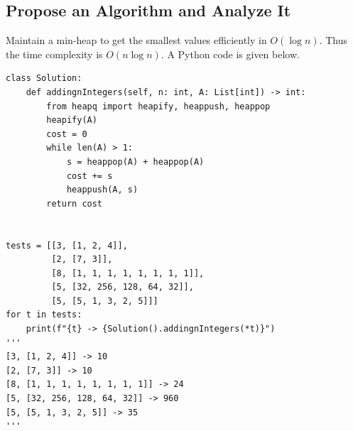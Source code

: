 \documentclass[12pt]{article}
\begin{document}
\subsection{Propose an Algorithm and Analyze It}
Maintain a min-heap to get the smallest values efficiently in $O(\log n)$. Thus the time complexity is $O(n\log n)$. A Python code is given below.
\begin{verbatim}
class Solution:
    def addingnIntegers(self, n: int, A: List[int]) -> int:
        from heapq import heapify, heappush, heappop
        heapify(A)
        cost = 0
        while len(A) > 1:
            s = heappop(A) + heappop(A)
            cost += s
            heappush(A, s)
        return cost


tests = [[3, [1, 2, 4]],
         [2, [7, 3]],
         [8, [1, 1, 1, 1, 1, 1, 1, 1]],
         [5, [32, 256, 128, 64, 32]],
         [5, [5, 1, 3, 2, 5]]]
for t in tests:
    print(f"{t} -> {Solution().addingnIntegers(*t)}")
'''
[3, [1, 2, 4]] -> 10
[2, [7, 3]] -> 10
[8, [1, 1, 1, 1, 1, 1, 1, 1]] -> 24
[5, [32, 256, 128, 64, 32]] -> 960
[5, [5, 1, 3, 2, 5]] -> 35
'''
\end{verbatim}
\end{document}
